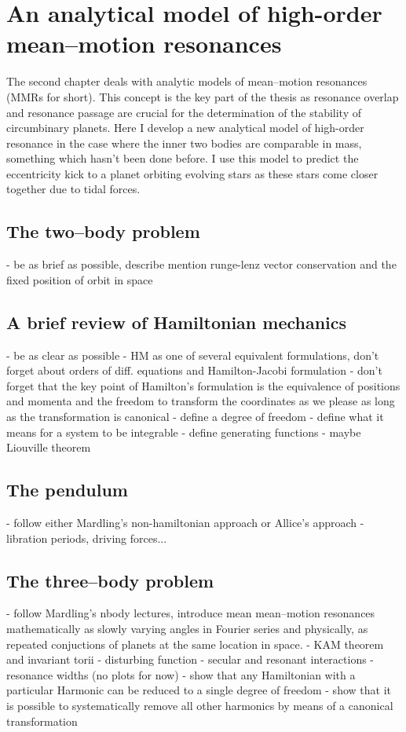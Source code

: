 \chapter{An analytical model of high-order mean--motion resonances}
\label{ch:analytical_model_of_high_order_mmrs}
The second chapter deals with analytic models of mean--motion resonances
(MMRs for short). This concept is the key part of the thesis as 
resonance overlap and resonance passage are crucial for the determination
of the stability of circumbinary planets. Here I develop a new analytical
model of high-order resonance in the case where the inner two bodies are 
comparable in mass, something which hasn't been done before. I use this 
model to predict the eccentricity kick to a planet orbiting evolving stars
as these stars come closer together due to tidal forces. 

\section{The two--body problem}
\label{sec:The two--body problem}
- be as brief as possible, describe mention runge-lenz vector
conservation and the fixed position of orbit in space


\section{A brief review of Hamiltonian mechanics}
\label{sec:A brief review of Hamiltonian mechanics}
- be as clear as possible
- HM as one of several equivalent formulations, don't forget about
orders of diff. equations and Hamilton-Jacobi formulation
- don't forget that the key point of Hamilton's formulation is 
the equivalence of positions and momenta and the freedom to transform
the coordinates as we please as long as the transformation is canonical
- define a degree of freedom
- define what it means for a system to be integrable
- define generating functions
- maybe Liouville theorem

\section{The pendulum}
\label{sec:The pendulum}
- follow either Mardling's non-hamiltonian approach or Allice's approach
- libration periods, driving forces...

\section{The three--body problem}
\label{sec:The three--body problem}
- follow Mardling's nbody lectures, introduce mean mean--motion
resonances mathematically as slowly varying angles in  Fourier series
and physically, as repeated conjuctions of planets at the same location
in space.
- KAM theorem and invariant torii
- disturbing function
- secular and resonant interactions
- resonance widths (no plots for now)
- show that any Hamiltonian with a particular Harmonic can be reduced to
a single degree of freedom
- show that it is possible to systematically remove all other harmonics
by means of a canonical transformation

